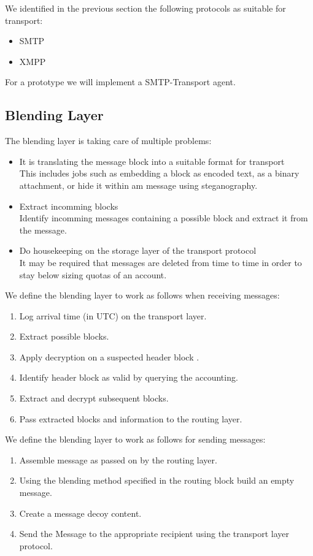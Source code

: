 We identified in the previous section the following protocols as suitable for transport:
\begin{itemize}
	\item SMTP
	\item XMPP
\end{itemize}

For a prototype we will implement a SMTP-Transport agent.

\subsection{Blending Layer}
The blending layer is taking care of multiple problems:
\begin{itemize}
	\item It is translating the message block into a suitable format for transport\\
	      This includes jobs such as embedding a block as encoded text, as a binary attachment, or hide it within am message using steganography.
	\item Extract incomming blocks\\
	      Identify incomming messages containing a possible block and extract it from the message.
	\item Do housekeeping on the storage layer of the transport protocol\\
	      It may be required that messages are deleted from time to time in order to stay below sizing quotas of an account.      
\end{itemize}

We define the blending layer to work as follows when receiving messages:

\begin{enumerate}
	\item Log arrival time (in UTC) on the transport layer.
	\item Extract possible blocks.
	\item Apply decryption on a suspected header block .
	\item Identify header block as valid by querying the accounting.
	\item Extract and decrypt subsequent blocks.
	\item Pass extracted blocks and information to the routing layer.
\end{enumerate}

We define the blending layer to work as follows for sending messages:

\begin{enumerate}
	\item Assemble message as passed on by the routing layer.
	\item Using the blending method specified in the routing block build an empty message. 
	\item Create a message decoy content.
	\item Send the Message to the appropriate recipient using the transport layer protocol.
\end{enumerate}

